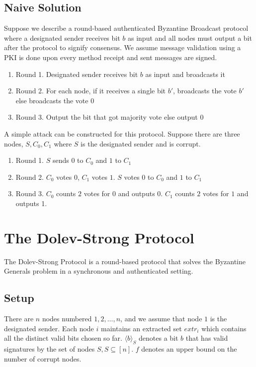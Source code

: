 \documentclass{article}
\begin{document}
\newpage
\subsection{Naive Solution}
Suppose we describe a round-based authenticated Byzantine Broadcast protocol where a designated sender receives bit $b$ as input and all nodes must output a bit after the protocol to signify consensus. We assume message validation using a PKI is done upon every method receipt and sent messages are signed.
\begin{enumerate}
    \item [] Round 1. Designated sender receives bit $b$ as input and broadcasts it
    \item [] Round 2. For each node, if it receives a single bit $b'$, broadcasts the vote $b'$ else broadcasts the vote $0$
    \item [] Round 3. Output the bit that got majority vote else output $0$
\end{enumerate}

A simple attack can be constructed for this protocol. Suppose there are three nodes, $S, C_0, C_1$ where $S$ is the designated sender and is corrupt. 
\begin{enumerate}
    \item [] Round 1. $S$ sends $0$ to $C_0$ and $1$ to $C_1$
    \item [] Round 2. $C_0$ votes $0$, $C_1$ votes $1$. $S$ votes $0$ to $C_0$ and $1$ to $C_1$
    \item [] Round 3. $C_0$ counts $2$ votes for $0$ and outputs 0. $C_1$ counts $2$ votes for $1$ and outputs 1.
\end{enumerate}

\section{The Dolev-Strong Protocol}

The Dolev-Strong Protocol is a round-based protocol that solves the Byzantine Generals problem in a synchronous and authenticated setting.

\subsection{Setup}
There are $n$ nodes numbered $1, 2,\dots, n$, and we assume that node $1$ is the designated sender. Each node $i$ maintains an extracted set $extr_i$ which contains all the distinct valid bits chosen so far. $\langle b \rangle_S$ denotes a bit $b$ that has valid signatures by the set of nodes $S, S \subseteq [n]$. $f$ denotes an upper bound on the number of corrupt nodes.
\end{document}
